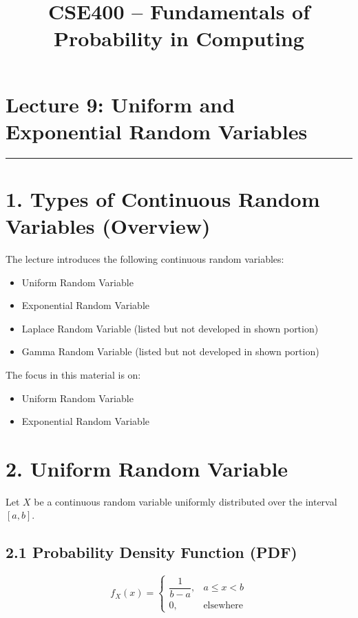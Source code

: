 \documentclass[12pt]{article}
\title{CSE400 – Fundamentals of Probability in Computing}
\author{}
\date{}
\begin{document}
\maketitle

\section*{Lecture 9: Uniform and Exponential Random Variables}

\hrule
\vspace{0.5cm}

\section*{1. Types of Continuous Random Variables (Overview)}

The lecture introduces the following continuous random variables:

\begin{itemize}
\item Uniform Random Variable
\item Exponential Random Variable
\item Laplace Random Variable (listed but not developed in shown portion)
\item Gamma Random Variable (listed but not developed in shown portion)
\end{itemize}

The focus in this material is on:

\begin{itemize}
\item Uniform Random Variable
\item Exponential Random Variable
\end{itemize}

\section*{2. Uniform Random Variable}

Let \( X \) be a continuous random variable uniformly distributed over the interval \( [a, b] \).

\subsection*{2.1 Probability Density Function (PDF)}

\[
f_X(x) =
\begin{cases}
\dfrac{1}{b-a}, & a \le x < b \\
0, & \text{elsewhere}
\end{cases}
\]
\end{document}
